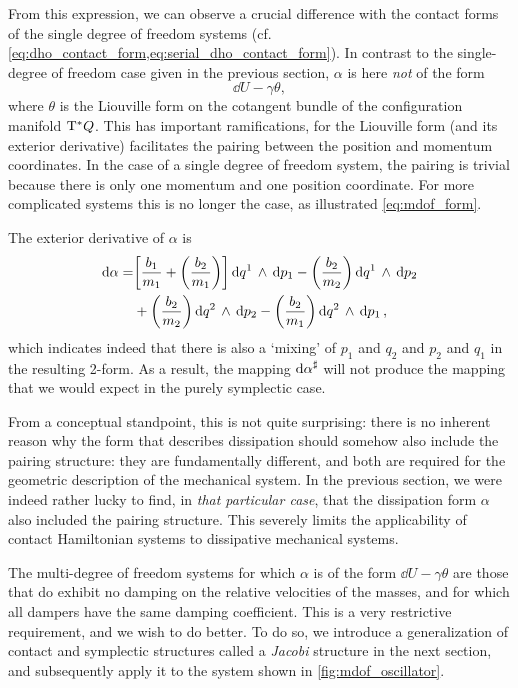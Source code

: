 From this expression, we can observe a crucial difference with the contact forms of the single degree of freedom systems (cf. \cref{eq:dho_contact_form,eq:serial_dho_contact_form}). In contrast to the single-degree of freedom case given in the previous section, \(\alpha\) is here \emph{not} of the form
\begin{equation}
     \dd{U} - \gamma \theta,
\end{equation}
where \(\theta\) is the Liouville form on the cotangent bundle of the configuration manifold \(\mathrm{T}^*Q\). This has important ramifications, for the Liouville form (and its exterior derivative) facilitates the pairing between the position and momentum coordinates. In the case of a single degree of freedom system, the pairing is trivial because there is only one momentum and one position coordinate. For more complicated systems this is no longer the case, as illustrated \cref{eq:mdof_form}.

The exterior derivative of \(\alpha\) is
\begin{equation}
    \begin{split}
         \dd{\alpha} = &\qty[\frac{b_1}{m_1} + \qty(\frac{b_2}{m_1})]  \dd{q^1}\,\wedge\,\dd{p_1} 
                      -\qty(\frac{b_2}{m_2}) \dd{q^1}\,\wedge\,\dd{p_2} \\
                      &+ \qty(\frac{b_2}{m_2}) \dd{q^2}\,\wedge\,\dd{p_2} 
                      - \qty(\frac{b_2}{m_1}) \dd{q^2}\,\wedge\,\dd{p_1} ,
    \end{split}
\end{equation}
which indicates indeed that there is also a `mixing' of \(p_1\) and \(q_2\) and \(p_2\) and \(q_1\) in the resulting 2-form. As a result, the mapping \( \dd{\alpha}^\sharp \) will not produce the mapping that we would expect in the purely symplectic case.

From a conceptual standpoint, this is not quite surprising: there is no inherent reason why the form that describes dissipation should somehow also include the pairing structure: they are fundamentally different, and both are required for the geometric description of the mechanical system. In the previous section, we were indeed rather lucky to find, in \emph{that particular case}, that the dissipation form \(\alpha\) also included the pairing structure. This severely limits the applicability of contact Hamiltonian systems to dissipative mechanical systems.

The multi-degree of freedom systems for which \( \alpha \) is of the form \(\dd{U} - \gamma \theta\) are those that do exhibit no damping on the relative velocities of the masses, and for which all dampers have the same damping coefficient. This is a very restrictive requirement, and we wish to do better. To do so, we introduce a generalization of contact and symplectic structures called a \emph{Jacobi} structure in the next section, and subsequently apply it to the system shown in \cref{fig:mdof_oscillator}.

